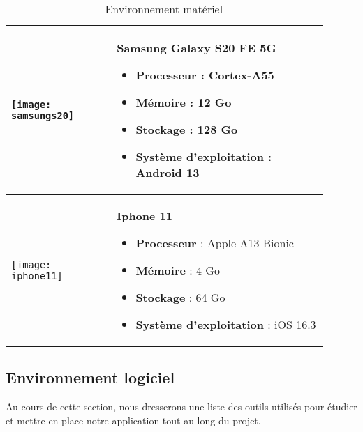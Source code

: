\begin{table}[H]
\begin{center}
\begin{tabular}{|p{0.3\linewidth}|p{0.6\linewidth}|}
      \hline
      \begin{minipage}{\linewidth}
        \texttt{[image: samsungs20]}
      \end{minipage} &
      \begin{minipage}{\linewidth}
        \vspace{0.2cm}
        \textbf{Samsung Galaxy S20 FE 5G}
        \begin{itemize}
          \item \textbf{Processeur} : Cortex-A55 
          \item \textbf{Mémoire} : 12 Go 
          \item \textbf{Stockage} : 128 Go
          \item \textbf{Système d'exploitation} : Android 13
        \end{itemize}
        \vspace{0.2cm}
      \end{minipage} \\

      \hline
      \begin{minipage}{\linewidth}
        \texttt{[image: iphone11]}
      \end{minipage} &
      \begin{minipage}{\linewidth}
        \vspace{0.2cm}
        \textbf{Iphone 11}
        \begin{itemize}
          \item \textbf{Processeur} : Apple A13 Bionic
          \item \textbf{Mémoire} : 4 Go
          \item \textbf{Stockage} : 64 Go
          \item \textbf{Système d'exploitation} : iOS 16.3
        \end{itemize}
        \vspace{0.2cm}
      \end{minipage} \\

      \hline
      
      

    \end{tabular}

  \caption{Environnement matériel}
  \label{tab:environnement_materiel}
  \end{center}
\end{table}

\subsection{Environnement logiciel}
Au cours de cette section, nous dresserons une liste des outils utilisés pour étudier et mettre en place notre application tout au long du projet.

